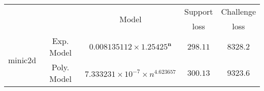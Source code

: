\begin{tabular}{ccccc} 
\hline 
 &  & \multirow{2}{*}{Model} & Support & Challenge\tabularnewline 
 &  &  & loss  & loss\tabularnewline 
\hline 
\hline 
\multirow{2}{*}{minic2d} & Exp. Model & $\mathbf{0.008135112\times 1.25425^{n}}$ & $\mathbf{298.11}$ & $\mathbf{8328.2}$ \tabularnewline 
 & Poly. Model & $7.333231\times10^{-7}\times n^{4.623657}$ & $300.13$ & $9323.6$ \tabularnewline 
\hline 
\end{tabular} 

